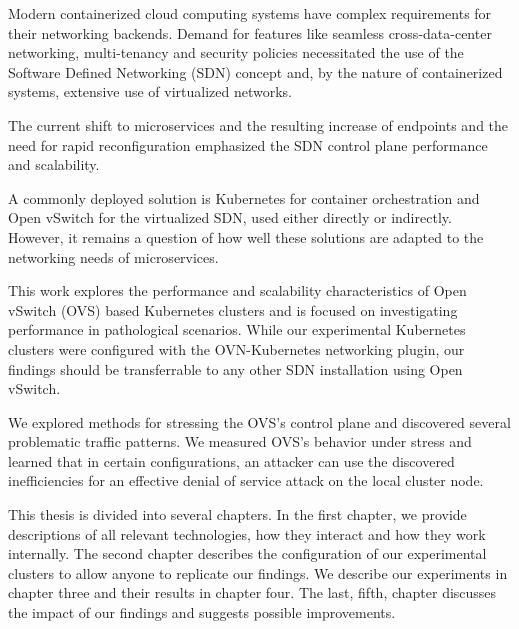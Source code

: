 


Modern containerized cloud computing systems have complex requirements for their networking backends. Demand for features like seamless cross-data-center networking, multi-tenancy and security policies necessitated the use of the Software Defined Networking (SDN) concept and, by the nature of containerized systems, extensive use of virtualized networks.

The current shift to microservices and the resulting increase of endpoints and the need for rapid reconfiguration emphasized the SDN control plane performance and scalability.

A commonly deployed solution is Kubernetes for container orchestration and Open vSwitch for the virtualized SDN, used either directly or indirectly. However, it remains a question of how well these solutions are adapted to the networking needs of microservices.

This work explores the performance and scalability characteristics of Open vSwitch (OVS) based Kubernetes clusters and is focused on investigating performance in pathological scenarios. While our experimental Kubernetes clusters were configured with the OVN-Kubernetes networking plugin, our findings should be transferrable to any other SDN installation using Open vSwitch.

We explored methods for stressing the OVS's control plane and discovered several problematic traffic patterns. We measured OVS's behavior under stress and learned that in certain configurations, an attacker can use the discovered inefficiencies for an effective denial of service attack on the local cluster node.

This thesis is divided into several chapters. In the first chapter, we provide descriptions of all relevant technologies, how they interact and how they work internally. The second chapter describes the configuration of our experimental clusters to allow anyone to replicate our findings. We describe our experiments in chapter three and their results in chapter four. The last, fifth, chapter discusses the impact of our findings and suggests possible improvements.



%
